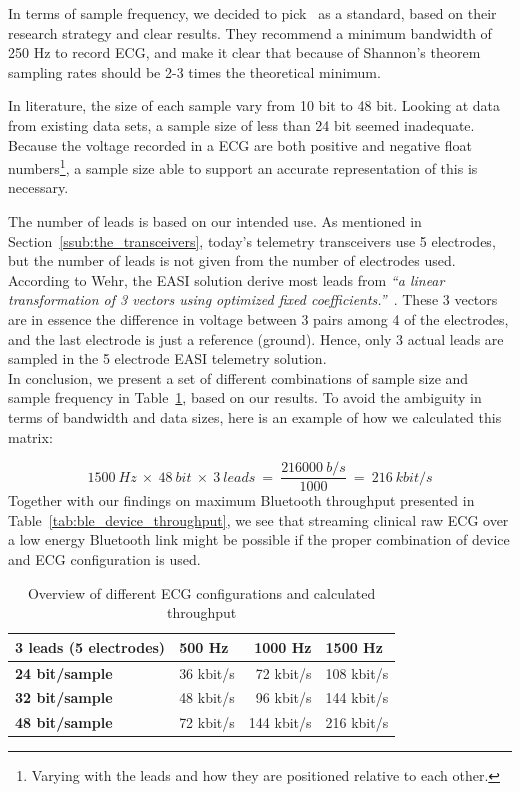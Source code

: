 In terms of sample frequency, we decided to pick~\cite{Rijnbeek:2001vu} as a standard, based on their research strategy and clear results. They recommend a minimum bandwidth of 250 Hz to record ECG, and make it clear that because of Shannon’s theorem sampling rates should be 2-3 times the theoretical minimum.

In literature, the size of each sample vary from 10 bit to 48 bit. Looking at data from existing data sets, a sample size of less than 24 bit seemed inadequate. Because the voltage recorded in a ECG are both positive and negative float numbers\footnote{ Varying with the leads and how they are positioned relative to each other.}, a sample size able to support an accurate representation of this is necessary. 

The number of leads is based on our intended use. As mentioned in Section~\ref{ssub:the_transceivers}, today's telemetry transceivers use 5 electrodes, but the number of leads is not given from the number of electrodes used. According to Wehr, the EASI solution derive most leads from \textit{``a linear transformation of 3 vectors using optimized fixed coefficients.''}~\cite{Wehr:2006ht}. These 3 vectors are in essence the difference in voltage between 3 pairs among 4 of the electrodes, and the last electrode is just a reference (ground). Hence, only 3 actual leads are sampled in the 5 electrode EASI telemetry solution.
\\
\newline
\noindent
In conclusion, we present a set of different combinations of sample size and sample frequency in Table~\ref{tab:ecg_sampling_rate}, based on our results. To avoid the ambiguity in terms of bandwidth and data sizes, here is an example of how we calculated this matrix:

\[
  1500\:Hz\:\times\:48\:bit\:\times\:3\:leads\:=\:\frac{216000\:b/s}{1000}\:=\:216\:kbit/s
\]
\noindent
Together with our findings on maximum Bluetooth throughput presented in Table~\ref{tab:ble_device_throughput}, we see that streaming clinical raw ECG over a low energy Bluetooth link might be possible if the proper combination of device and ECG configuration is used.

\begin{table}[]
\centering
\caption{Overview of different ECG configurations and calculated throughput}
\label{tab:ecg_sampling_rate}
\begin{tabular}{@{}l|lrl@{}}
\toprule
\textbf{3 leads (5 electrodes)} & \textbf{500 Hz} & \textbf{1000 Hz} & \textbf{1500 Hz} \\ \midrule
\textbf{24 bit/sample}         & 36 kbit/s & 72 kbit/s & 108 kbit/s         \\
\textbf{32 bit/sample}         & 48 kbit/s & 96 kbit/s & 144 kbit/s         \\
\textbf{48 bit/sample}         & 72 kbit/s & 144 kbit/s  & 216 kbit/s         \\ \bottomrule
\end{tabular}
\end{table}



